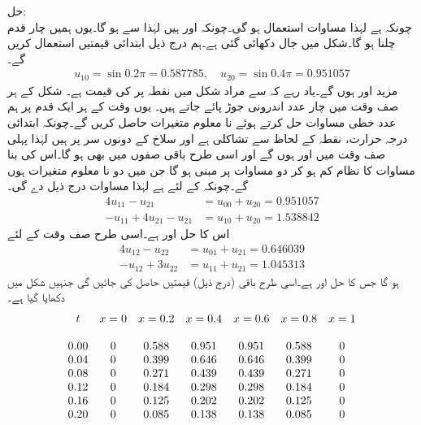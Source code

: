 حل:\quad {}\\
چونکہ  ہے لہٰذا مساوات  استعمال ہو گی۔چونکہ  اور  ہیں لہٰذا  سے  ہو گا۔یوں ہمیں چار قدم چلنا ہو گا۔شکل  میں جال دکھائی گئی ہے۔ہم درج ذیل ابتدائی قیمتیں استعمال کریں گے۔
\begin{align*}
u_{10}=\sin 0.2\pi=\num{0.587785},\quad u_{20}=\sin 0.4\pi=\num{0.951057}
\end{align*}
مزید  اور  ہوں گے۔یاد رہے کہ  سے مراد شکل  میں نقطہ  پر  کی قیمت ہے۔ شکل کے ہر صف وقت میں چار عدد اندرونی جوڑ پائے جاتے ہیں۔ یوں وقت کے ہر ایک قدم پر ہم  عدد خطی مساوات حل کرتے ہوئے   نا معلوم متغیرات حاصل کریں گے۔چونکہ ابتدائی درجہ حرارت، نقطہ  کے لحاظ سے تشاکلی ہے اور سلاخ کے دونوں سر  پر ہیں لہٰذا پہلی صف وقت میں  اور  ہوں گے اور اسی طرح باقی صفوں میں بھی ہو گا۔اس کی بنا مساوات کا نظام کم ہو کر دو مساوات پر مبنی ہو گا جن میں دو نا معلوم متغیرات ہوں گے۔چونکہ  کے لئے  ہے لہٰذا مساوات  درج ذیل دے گی۔
\begin{align*}
4u_{11}-u_{21}\phantom{+u_{32}}&=u_{00}+u_{20}=\num{0.951057}\\
-u_{11}+4u_{21}-u_{21}&=u_{10}+u_{20}=\num{1.538842}
\end{align*}
اس کا حل  اور  ہے۔اسی طرح صف وقت  کے لئے
\begin{align*}
4u_{12}-u_{22}&=u_{01}+u_{21}=\num{0.646039}\\
-u_{12}+3u_{22}&=u_{11}+u_{21}=\num{1.045313}
\end{align*}
ہو گا جس کا حل  اور  ہے۔اسی طرح باقی  (درج ذیل) قیمتیں حاصل کی جائیں گی جنہیں شکل  میں دکھایا گیا ہے۔
\begin{align*}
\centering
\begin{array}{ccccccc}
t&x=0&x=0.2&x=0.4&x=0.6&x=0.8&x=1\\
&&&&&&\\
0.00&0&0.588&0.951&0.951&0.588&0\\
0.04&0&0.399&0.646&0.646&0.399&0\\
0.08&0&0.271&0.439&0.439&0.271&0\\
0.12&0&0.184&0.298&0.298&0.184&0\\
0.16&0&0.125&0.202&0.202&0.125&0\\
0.20&0&0.085&0.138&0.138&0.085&0
\end{array}
\end{align*} 
